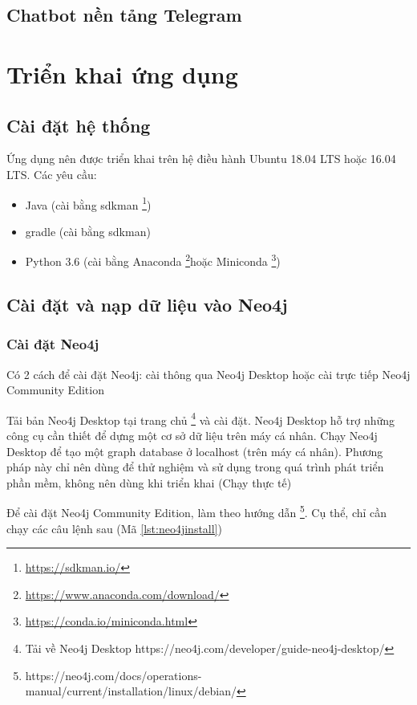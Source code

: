 \subsection{Chatbot nền tảng Telegram}

\section{Triển khai ứng dụng}

\subsection{Cài đặt hệ thống}

Ứng dụng nên được triển khai trên hệ điều hành Ubuntu 18.04 LTS hoặc 16.04 LTS. Các yêu cầu: 

\begin{itemize}
\item Java (cài bằng sdkman \footnote{\url{https://sdkman.io/}})
\item gradle (cài bằng sdkman)
\item Python 3.6 (cài bằng Anaconda \footnote{\url{https://www.anaconda.com/download/}}hoặc Miniconda \footnote{\url{https://conda.io/miniconda.html}})
\end{itemize}

\subsection{Cài đặt và nạp dữ liệu vào Neo4j}
\subsubsection{Cài đặt Neo4j} \label{sec:installneo4jinstance}

Có 2 cách để cài đặt Neo4j: cài thông qua Neo4j Desktop hoặc cài trực tiếp Neo4j Community Edition

Tải bản Neo4j Desktop tại trang chủ \footnote{Tải về Neo4j Desktop https://neo4j.com/developer/guide-neo4j-desktop/} và cài đặt. Neo4j Desktop hỗ trợ những công cụ cần thiết để dựng một cơ sở dữ liệu trên máy cá nhân. Chạy Neo4j Desktop để tạo một graph database ở localhost (trên máy cá nhân). Phương pháp này chỉ nên dùng để thử nghiệm và sử dụng trong quá trình phát triển phần mềm, không nên dùng khi triển khai (Chạy thực tế)

Để cài đặt Neo4j Community Edition, làm theo hướng dẫn \footnote{https://neo4j.com/docs/operations-manual/current/installation/linux/debian/}. Cụ thể, chỉ cần chạy các câu lệnh sau (Mã \ref{lst:neo4jinstall})

